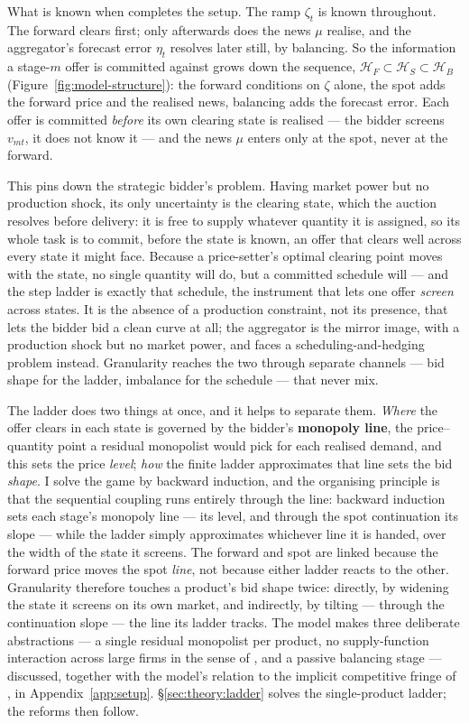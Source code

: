 \documentclass[11pt,a4paper]{article}
\theoremstyle{definition}
\theoremstyle{remark}
\theoremstyle{plain}
\begin{document}
What is known when completes the setup. The ramp $\zeta_t$ is known throughout. The forward clears first; only afterwards does the news $\mu$ realise, and the aggregator's forecast error $\eta_t$ resolves later still, by balancing. So the information a stage-$m$ offer is committed against grows down the sequence, $\mathcal{H}_F \subset \mathcal{H}_S \subset \mathcal{H}_B$ (Figure~\ref{fig:model-structure}): the forward conditions on $\zeta$ alone, the spot adds the forward price and the realised news, balancing adds the forecast error. Each offer is committed \emph{before} its own clearing state is realised --- the bidder screens $v_{mt}$, it does not know it --- and the news $\mu$ enters only at the spot, never at the forward.

This pins down the strategic bidder's problem. Having market power but no production shock, its only uncertainty is the clearing state, which the auction resolves before delivery: it is free to supply whatever quantity it is assigned, so its whole task is to commit, before the state is known, an offer that clears well across every state it might face. Because a price-setter's optimal clearing point moves with the state, no single quantity will do, but a committed schedule will --- and the step ladder is exactly that schedule, the instrument that lets one offer \emph{screen} across states. It is the absence of a production constraint, not its presence, that lets the bidder bid a clean curve at all; the aggregator is the mirror image, with a production shock but no market power, and faces a scheduling-and-hedging problem instead. Granularity reaches the two through separate channels --- bid shape for the ladder, imbalance for the schedule --- that never mix.

The ladder does two things at once, and it helps to separate them. \emph{Where} the offer clears in each state is governed by the bidder's \textbf{monopoly line}, the price--quantity point a residual monopolist would pick for each realised demand, and this sets the price \emph{level}; \emph{how} the finite ladder approximates that line sets the bid \emph{shape}. I solve the game by backward induction, and the organising principle is that the sequential coupling runs entirely through the line: backward induction sets each stage's monopoly line --- its level, and through the spot continuation its slope --- while the ladder simply approximates whichever line it is handed, over the width of the state it screens. The forward and spot are linked because the forward price moves the spot \emph{line}, not because either ladder reacts to the other. Granularity therefore touches a product's bid shape twice: directly, by widening the state it screens on its own market, and indirectly, by tilting --- through the continuation slope --- the line its ladder tracks. The model makes three deliberate abstractions --- a single residual monopolist per product, no supply-function interaction across large firms in the sense of \citet{klemperer_meyer_1989}, and a passive balancing stage --- discussed, together with the model's relation to the implicit competitive fringe of \citeauthor{ito_reguant_2016}, in Appendix~\ref{app:setup}. \S\ref{sec:theory:ladder} solves the single-product ladder; the reforms then follow.
\end{document}
